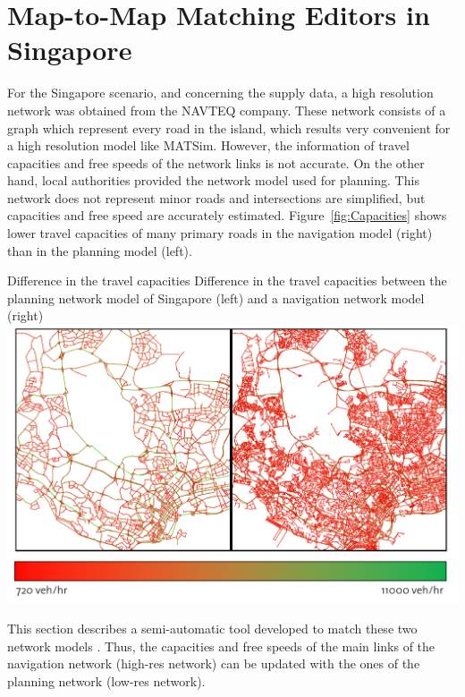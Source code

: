 \section{Map-to-Map Matching Editors in Singapore}
\label{sec:networkeditor-singapore}
For the Singapore scenario, and concerning the supply data, a high resolution network was obtained from the NAVTEQ company. These network consists of a graph which represent every road in the island, which results very convenient for a high resolution model like MATSim. However, the information of travel capacities and free speeds of the network links is not accurate. On the other hand, local authorities provided the network model used for planning. This network does not represent minor roads and intersections are simplified, but capacities and free speed are accurately estimated. Figure~\ref{fig:Capacities} shows lower travel capacities of many primary roads in the navigation model (right) than in the planning model (left).

\createfigure
{Difference in the travel capacities}
{Difference in the travel capacities between the planning network model of Singapore (left) and a navigation network model (right)}
{\label{fig:Capacities}}
{\includegraphics[width=1.0\textwidth]{extending/figures/netEdSing/Capacities.png}}
{}

This section describes a semi-automatic tool developed to match these two network models \citep[][]{Ordonez_Webpage_2011_3}. Thus, the capacities and free speeds of the main links of the navigation network (high-res network) can be updated with the ones of the planning network (low-res network).

